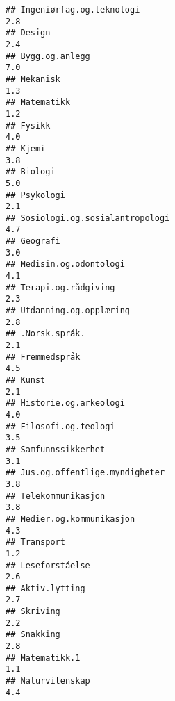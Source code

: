 \documentclass[
]{article}
\begin{document}
\begin{verbatim}
## Ingeniørfag.og.teknologi                                                         2.8
## Design                                                                           2.4
## Bygg.og.anlegg                                                                   7.0
## Mekanisk                                                                         1.3
## Matematikk                                                                       1.2
## Fysikk                                                                           4.0
## Kjemi                                                                            3.8
## Biologi                                                                          5.0
## Psykologi                                                                        2.1
## Sosiologi.og.sosialantropologi                                                   4.7
## Geografi                                                                         3.0
## Medisin.og.odontologi                                                            4.1
## Terapi.og.rådgiving                                                              2.3
## Utdanning.og.opplæring                                                           2.8
## .Norsk.språk.                                                                    2.1
## Fremmedspråk                                                                     4.5
## Kunst                                                                            2.1
## Historie.og.arkeologi                                                            4.0
## Filosofi.og.teologi                                                              3.5
## Samfunnssikkerhet                                                                3.1
## Jus.og.offentlige.myndigheter                                                    3.8
## Telekommunikasjon                                                                3.8
## Medier.og.kommunikasjon                                                          4.3
## Transport                                                                        1.2
## Leseforståelse                                                                   2.6
## Aktiv.lytting                                                                    2.7
## Skriving                                                                         2.2
## Snakking                                                                         2.8
## Matematikk.1                                                                     1.1
## Naturvitenskap                                                                   4.4

\end{verbatim}
\end{document}
